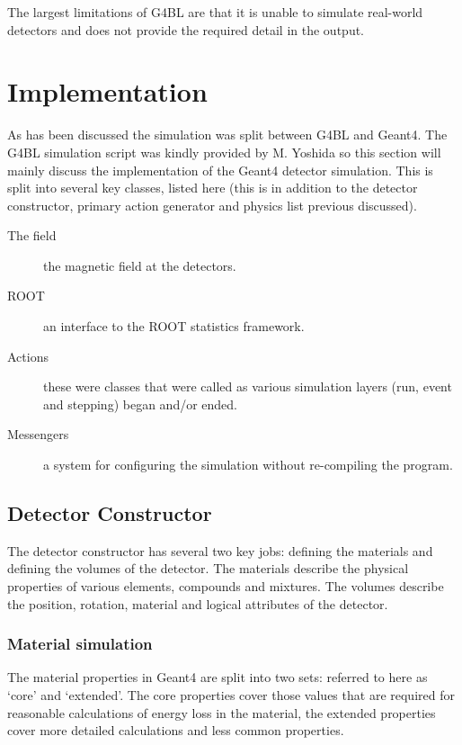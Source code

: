 The largest limitations of G4BL are that it is unable to simulate real-world detectors and does not provide the required detail in the output. 

\chapter{Implementation} %
\label{cha:implementation}
As has been discussed the simulation was split between G4BL and Geant4. The G4BL simulation script was kindly provided by M. Yoshida so this section will mainly discuss the implementation of the Geant4 detector simulation. This is split into several key classes, listed here (this is in addition to the detector constructor, primary action generator and physics list previous discussed).
\begin{description}
  \item[The field] the magnetic field at the detectors.
  \item[ROOT] an interface to the ROOT statistics framework.
  \item[Actions] these were classes that were called as various simulation layers (run, event and stepping) began and/or ended.
  \item[Messengers] a system for configuring the simulation without re-compiling the program.
\end{description}
\section{Detector Constructor} %
\label{sec:detector_constructor}
The detector constructor has several two key jobs: defining the materials and defining the volumes of the detector. The materials describe the physical properties of various elements, compounds and mixtures. The volumes describe the position, rotation, material and logical attributes of the detector. 

\subsection{Material simulation} %
\label{sub:material_simulation}
The material properties in Geant4 are split into two sets: referred to here as `core' and `extended'. The core properties cover those values that are required for reasonable calculations of energy loss in the material, the extended properties cover more detailed calculations and less common properties. 

